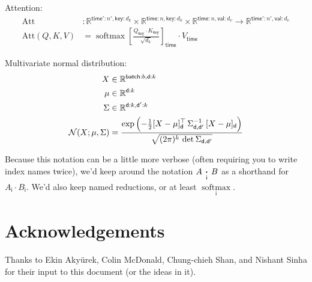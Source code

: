 \documentclass{article}
\newcommand{\name}[1]{\mathsf{#1}}
\newcommand{\ndot}[1]{\mathbin{\mathop{\thinspace\boldsymbol\cdot\thinspace}\limits_{\name{#1}}}}
\newcommand{\nfun}[2]{\mathop{\text{#2}}\limits_{\name{#1}}}
\DeclareMathOperator*{\softmax}{softmax}
\begin{document}
Attention:
\begin{align*}
  \text{Att} &\colon \mathbb{R}^{\name{time'}:n',\name{key}:d_k} \times \mathbb{R}^{\name{time}:n,\name{key}:d_k} \times \mathbb{R}^{\name{time}:n,\name{val}:d_v} \rightarrow \mathbb{R}^{\name{time'}:n',\name{val}:d_v} \\
  \text{Att}(Q,K,V) &= \softmax \left[ \frac{Q_{\name{key}} \cdot K_\name{key}}{\sqrt{d_k}} \right]_{\name{time}} \cdot V_{\name{time}}
\end{align*}

Multivariate normal distribution:
\begin{align*} 
X &\in \mathbb{R}^{\name{batch}:{b}, \name{d}:{k}}  \\
\mu &\in \mathbb{R}^{{\name{d}:{k}}}  \\
\Sigma & \in   \mathbb{R}^{{\name{d}:{k}, \name{d'}:{k}}}  \\
{\cal N}(X; \mu, \Sigma) &= \frac{\displaystyle \exp\left(-\tfrac{1}{2} [X - \mu]_{\name{d}}^\top \, \Sigma_{\name{d},\name{d'}}^{-1} \, [X - \mu]_{\name{d}} \right) }{\sqrt{(2 \pi)^k \, \mathop{\text{det}} \Sigma_{\name{d},\name{d'}}} }
\end{align*}

Because this notation can be a little more verbose (often requiring you to write index names twice), we'd keep around the notation $A \ndot{i} B$ as a shorthand for $A_{\name{i}} \cdot B_{\name{i}}$. We'd also keep named reductions, or at least $\nfun{i}{softmax}$.

\section*{Acknowledgements}

Thanks to Ekin Aky\"{u}rek, Colin McDonald, Chung-chieh Shan, and Nishant Sinha for their input to this document (or the ideas in it).

\iffalse %
\section*{References}
\fi



\end{document}
